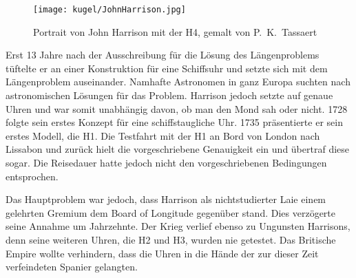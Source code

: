 \begin{refsection}
\begin{figure}[htbp]
\centering
\texttt{[image: kugel/JohnHarrison.jpg]}
\caption{Portrait von John Harrison mit der H4, gemalt von P.~K.~Tassaert}
\end{figure}

Erst 13 Jahre nach der Ausschreibung für die Lösung des Längenproblems
tüftelte er an einer Konstruktion für eine Schiffsuhr und setzte
sich mit dem Längenproblem auseinander.
Namhafte Astronomen in ganz Europa suchten nach astronomischen
Lösungen für das Problem. Harrison jedoch setzte auf genaue Uhren
und war somit unabhängig davon, ob man den Mond sah oder nicht.
1728 folgte sein erstes Konzept für eine schiffstaugliche Uhr. 1735
präsentierte er sein erstes Modell, die H1. Die Testfahrt mit der
H1 an Bord von London nach Lissabon und zurück hielt die vorgeschriebene
Genauigkeit ein und übertraf diese sogar. Die Reisedauer hatte
jedoch nicht den vorgeschriebenen Bedingungen entsprochen.

Das Hauptproblem war jedoch, dass Harrison als nichtstudierter Laie
einem gelehrten Gremium dem Board of Longitude gegenüber stand.
Dies verzögerte seine Annahme um Jahrzehnte. Der Krieg verlief
ebenso zu Ungunsten Harrisons, denn seine weiteren Uhren, die H2
und H3, wurden nie getestet. Das Britische Empire wollte verhindern,
dass die Uhren in die Hände der zur dieser Zeit verfeindeten Spanier
gelangten.


\end{refsection}
